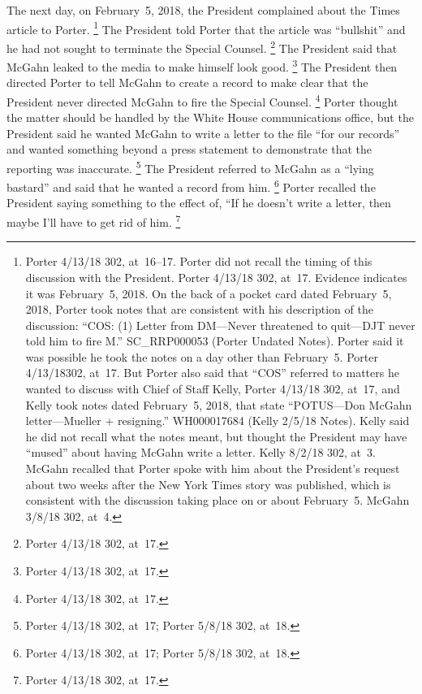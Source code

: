 The next day, on February~5, 2018, the President complained about the Times article to Porter.%
\footnote{Porter 4/13/18 302, at~16--17.
Porter did not recall the timing of this discussion with the President.
Porter 4/13/18 302, at~17.
Evidence indicates it was February~5, 2018.
On the back of a pocket card dated February~5, 2018, Porter took notes that are consistent with his description of the discussion: ``COS: (1) Letter from DM---Never threatened to quit---DJT never told him to fire M.''
SC\_RRP000053 (Porter Undated Notes).
Porter said it was possible he took the notes on a day other than February~5.
Porter 4/13/18302, at~17.
But Porter also said that ``COS'' referred to matters he wanted to discuss with Chief of Staff Kelly, Porter 4/13/18 302, at~17, and Kelly took notes dated February~5, 2018, that state ``POTUS---Don McGahn letter---Mueller + resigning.''
WH000017684 (Kelly 2/5/18 Notes).
Kelly said he did not recall what the notes meant, but thought the President may have ``mused'' about having McGahn write a letter.
Kelly 8/2/18 302, at~3.
McGahn recalled that Porter spoke with him about the President's request about two weeks after the New York Times story was published, which is consistent with the discussion taking place on or about February~5.
McGahn 3/8/18 302, at~4.}
The President told Porter that the article was ``bullshit'' and he had not sought to terminate the Special Counsel.%
\footnote{Porter 4/13/18 302, at~17.}
The President said that McGahn leaked to the media to make himself look good.%
\footnote{Porter 4/13/18 302, at~17.}
The President then directed Porter to tell McGahn to create a record to make clear that the President never directed McGahn to fire the Special Counsel.%
\footnote{Porter 4/13/18 302, at~17.}
Porter thought the matter should be handled by the White House communications office, but the President said he wanted McGahn to write a letter to the file ``for our records'' and wanted something beyond a press statement to demonstrate that the reporting was inaccurate.%
\footnote{Porter 4/13/18 302, at~17;
Porter 5/8/18 302, at~18.}
The President referred to McGahn as a ``lying bastard'' and said that he wanted a record from him.%
\footnote{Porter 4/13/18 302, at~17;
Porter 5/8/18 302, at~18.}
Porter recalled the President saying something to the effect of, ``If he doesn't write a letter, then maybe I'll have to get rid of him.%
\footnote{Porter 4/13/18 302, at~17.}

